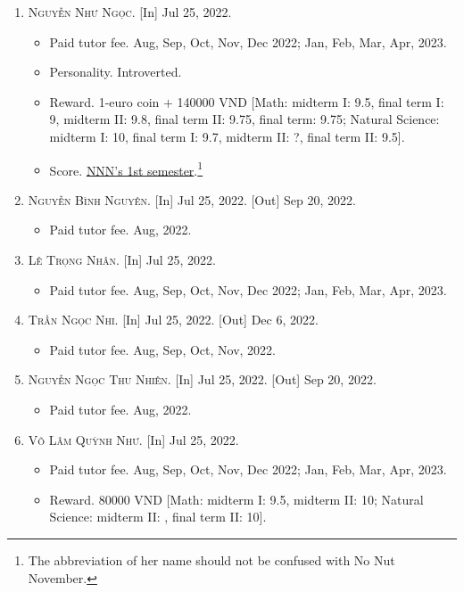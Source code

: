 \documentclass{article}
\begin{document}
\begin{enumerate}
	\item \textsc{Nguyễn Như Ngọc.} \textsf{[In]} Jul 25, 2022.
	\begin{itemize}
		\item \textsf{Paid tutor fee.} Aug, Sep, Oct, Nov, Dec 2022; Jan, Feb, Mar, Apr, 2023.
		\item \textsf{Personality.} Introverted.
		\item \textsf{Reward.} 1-euro coin $+$ 140000 VND [Math: midterm I: 9.5, final term I: 9, midterm II: 9.8, final term II: 9.75, final term: 9.75; Natural Science: midterm I: 10, final term I: 9.7, midterm II: ?, final term II: 9.5].
		\item \textsf{Score.} \href{https://github.com/NQBH/hobby/blob/master/STEM/student/Nguyen_Nhu_Ngoc_grade_6_1st_semester.jpg}{NNN's 1st semester}.\footnote{The abbreviation of her name should not be confused with No Nut November.}
	\end{itemize}
	\item \textsc{Nguyễn Bình Nguyên.} \textsf{[In]} Jul 25, 2022. \textsf{[Out]} Sep 20, 2022.
	\begin{itemize}
		\item \textsf{Paid tutor fee.} Aug, 2022.
	\end{itemize}
	\item \textsc{Lê Trọng Nhân.} \textsf{[In]} Jul 25, 2022.
	\begin{itemize}
		\item \textsf{Paid tutor fee.} Aug, Sep, Oct, Nov, Dec 2022; Jan, Feb, Mar, Apr, 2023.
	\end{itemize}
	\item \textsc{Trần Ngọc Nhi.} \textsf{[In]} Jul 25, 2022. \textsf{[Out]} Dec 6, 2022.
	\begin{itemize}
		\item \textsf{Paid tutor fee.} Aug, Sep, Oct, Nov, 2022.
	\end{itemize}
	\item \textsc{Nguyễn Ngọc Thu Nhiên.} \textsf{[In]} Jul 25, 2022. \textsf{[Out]} Sep 20, 2022.
	\begin{itemize}
		\item \textsf{Paid tutor fee.} Aug, 2022.
	\end{itemize}
	\item \textsc{Võ Lâm Quỳnh Như.} \textsf{[In]} Jul 25, 2022.
	\begin{itemize}
		\item \textsf{Paid tutor fee.} Aug, Sep, Oct, Nov, Dec 2022; Jan, Feb, Mar, Apr, 2023.
		\item \textsf{Reward.} 80000 VND [Math: midterm I: 9.5, midterm II: 10; Natural Science: midterm II: , final term II: 10].

\end{itemize}
\end{enumerate}
\end{document}
